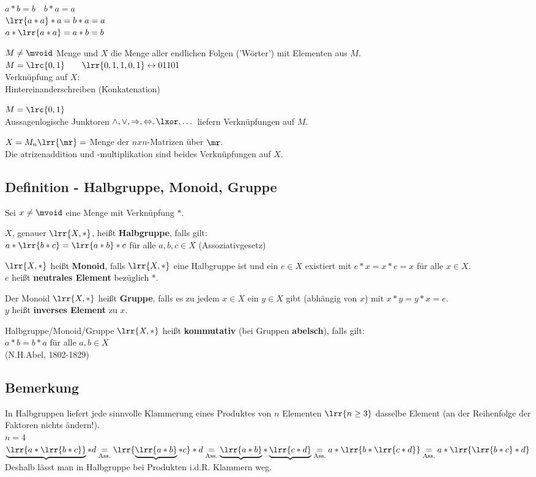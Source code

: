 			$a*b=b\quad b*a=a$\\
			$\lrr{a*a}*a=b*a=a$\\
			$a*\lrr{a*a}=a*b=b$
		\item $M\neq\mvoid$ Menge und $X$ die Menge aller endlichen Folgen ('Wörter') mit Elementen aus $M$.\\
			$M=\lrc{0,1}\qquad\lrr{0,1,1,0,1}\leftrightarrow 01101$\\
			Verknüpfung auf $X$:\\
			Hintereinanderschreiben (Konkatenation)
		\item $M=\lrc{0,1}$\\
			Aussagenlogische Junktoren $\land,\lor,\Rightarrow,\Leftrightarrow,\lxor,\dots$ liefern Verknüpfungen auf $M$.
		\item $X=M_n\lrr{\mr}=$ Menge der $nxn$-Matrizen über $\mr$.\\
			Die atrizenaddition und -multiplikation sind beides Verknüpfungen auf $X$.
	\subExEnd
\subsection{Definition - Halbgruppe, Monoid, Gruppe}
	Sei $x\neq\mvoid$ eine Menge mit Verknüpfung $*$.
		\item $X$, genauer $\lrr{X,*}$, heißt \textbf{Halbgruppe}, falls gilt: \\
			$a*\lrr{b*c}=\lrr{a*b}*c$ für alle $a,b,c\in X$ (Assoziativgesetz)
		\item $\lrr{X,*}$ heißt \textbf{Monoid}, falls $\lrr{X,*}$ eine Halbgruppe ist und ein $e\in X$ existiert mit $e*x=x*e=x$ für alle $x\in X$. \\
			$e$ heißt \textbf{neutrales Element} bezüglich *.
		\item Der Monoid $\lrr{X,*}$ heißt \textbf{Gruppe}, falls es zu jedem $x\in X$ ein $y\in X$ gibt (abhängig von $x$) mit $x*y=y*x = e$.\\
			$y$ heißt \textbf{inverses Element} zu $x$.
		\item Halbgruppe/Monoid/Gruppe $\lrr{X,*}$ heißt \textbf{kommutativ} (bei Gruppen \textbf{abelsch}), falls gilt:\\
			$a*b=b*a$ für alle $a,b\in X$ \\
			(N.H.Abel, 1802-1829)
	\subExEnd
\subsection{Bemerkung}
	In Halbgruppen liefert jede sinnvolle Klammerung eines Produktes von $n$ Elementen $\lrr{n\geq 3}$ dasselbe Element (an der Reihenfolge der Faktoren nichts ändern!).\\
	$n=4$\\
	$\underbrace{\lrr{a*\lrr{b*c}}}*d\underset{\mbox{\scriptsize Ass.}}{=}\lrr{\underbrace{\lrr{a*b}}*c}*d\underset{\mbox{\scriptsize Ass.}}{=}\underbrace{\lrr{a*b}}*\underbrace{\lrr{c*d}}\underset{\mbox{\scriptsize Ass.}}{=}a*\lrr{b*\lrr{c*d}}\underset{\mbox{\scriptsize Ass.}}{=}a*\lrr{\lrr{b*c}*d}$\\
	Deshalb lässt man in Halbgruppe bei Produkten i.d.R. Klammern weg.
	
